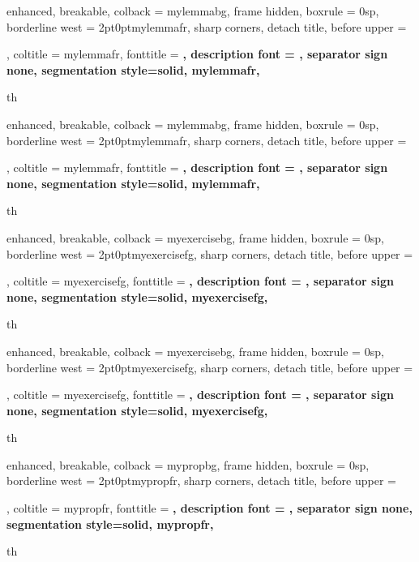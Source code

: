 
{%
	enhanced,
	breakable,
	colback = mylemmabg,
	frame hidden,
	boxrule = 0sp,
	borderline west = {2pt}{0pt}{mylemmafr},
	sharp corners,
	detach title,
	before upper = \tcbtitle\par\smallskip,
	coltitle = mylemmafr,
	fonttitle = \bfseries\sffamily,
	description font = \mdseries,
	separator sign none,
	segmentation style={solid, mylemmafr},
}
{th}

{%
	enhanced,
	breakable,
	colback = mylemmabg,
	frame hidden,
	boxrule = 0sp,
	borderline west = {2pt}{0pt}{mylemmafr},
	sharp corners,
	detach title,
	before upper = \tcbtitle\par\smallskip,
	coltitle = mylemmafr,
	fonttitle = \bfseries\sffamily,
	description font = \mdseries,
	separator sign none,
	segmentation style={solid, mylemmafr},
}
{th}


{%
	enhanced,
	breakable,
	colback = myexercisebg,
	frame hidden,
	boxrule = 0sp,
	borderline west = {2pt}{0pt}{myexercisefg},
	sharp corners,
	detach title,
	before upper = \tcbtitle\par\smallskip,
	coltitle = myexercisefg,
	fonttitle = \bfseries\sffamily,
	description font = \mdseries,
	separator sign none,
	segmentation style={solid, myexercisefg},
}
{th}

{%
	enhanced,
	breakable,
	colback = myexercisebg,
	frame hidden,
	boxrule = 0sp,
	borderline west = {2pt}{0pt}{myexercisefg},
	sharp corners,
	detach title,
	before upper = \tcbtitle\par\smallskip,
	coltitle = myexercisefg,
	fonttitle = \bfseries\sffamily,
	description font = \mdseries,
	separator sign none,
	segmentation style={solid, myexercisefg},
}
{th}



{%
	enhanced,
	breakable,
	colback = mypropbg,
	frame hidden,
	boxrule = 0sp,
	borderline west = {2pt}{0pt}{mypropfr},
	sharp corners,
	detach title,
	before upper = \tcbtitle\par\smallskip,
	coltitle = mypropfr,
	fonttitle = \bfseries\sffamily,
	description font = \mdseries,
	separator sign none,
	segmentation style={solid, mypropfr},
}
{th}

